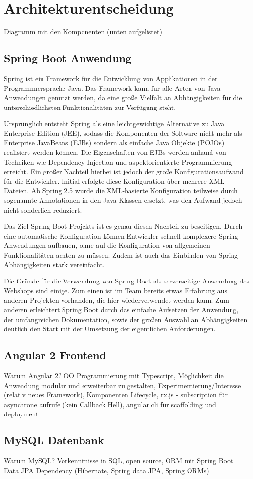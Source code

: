 \section{Architekturentscheidung}\label{arch_decission}
Diagramm mit den Komponenten (unten aufgelistet) %

\subsection{Spring Boot Anwendung}
Spring ist ein Framework für die Entwicklung von Applikationen in der Programmiersprache Java. Das Framework kann für alle Arten von Java-Anwendungen genutzt werden, da eine große Vielfalt an Abhängigkeiten für die unterschiedlichsten Funktionalitäten zur Verfügung steht.

Ursprünglich entsteht Spring als eine leichtgewichtige Alternative zu Java Enterprise Edition (JEE), sodass die Komponenten der Software nicht mehr als Enterprise JavaBeans (EJBs) sondern als einfache Java Objekte (POJOs) realisiert werden können. Die Eigenschaften von EJBs werden anhand von Techniken wie Dependency Injection und aspektorientierte Programmierung erreicht. Ein großer Nachteil hierbei ist jedoch der große Konfigurationsaufwand für die Entwickler. Initial erfolgte diese Konfiguration über mehrere XML-Dateien. Ab Spring 2.5 wurde die XML-basierte Konfiguration teilweise durch sogenannte Annotationen in den Java-Klassen ersetzt, was den Aufwand jedoch nicht sonderlich reduziert\cite{Walls2015}.

Das Ziel Spring Boot Projekts ist es genau diesen Nachteil zu beseitigen. Durch eine automatische Konfiguration können Entwickler schnell komplexere Spring-Anwendungen aufbauen, ohne auf die Konfiguration von allgemeinen Funktionalitäten achten zu müssen. Zudem ist auch das Einbinden von Spring-Abhängigkeiten stark vereinfacht\cite{Webb2013}.

Die Gründe für die Verwendung von Spring Boot als serverseitige Anwendung des Webshops sind einige. Zum einen ist im Team bereits etwas Erfahrung aus anderen Projekten vorhanden, die hier wiederverwendet werden kann. Zum anderen erleichtert Spring Boot durch das einfache Aufsetzen der Anwendung, der umfangreichen Dokumentation, sowie der großen Auswahl an Abhängigkeiten deutlich den Start mit der Umsetzung der eigentlichen Anforderungen.

\subsection{Angular 2 Frontend}
Warum Angular 2? OO Programmierung mit Typescript, Möglichkeit die Anwendung modular und erweiterbar zu gestalten, Experimentierung/Interesse (relativ neues Framework), Komponenten Lifecycle, rx.js - subscription für asynchrone aufrufe (kein Callback Hell), angular cli für scaffolding und deployment

\subsection{MySQL Datenbank}
Warum MySQL? Vorkenntnisse in SQL, open source, ORM mit Spring Boot Data JPA Dependency (Hibernate, Spring data JPA, Spring ORMs)